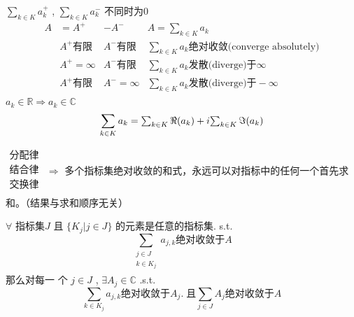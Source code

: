 \documentclass[mode=geye, chinesefont=founder]{elegantnote}
\newcommand\tikznode[3][]%
{\tikz[remember picture,baseline=(#2.base)]
	\node[minimum size=0pt,inner sep=0pt,#1](#2){#3};%
}
\begin{document}
$ \sum_{k\in K} a_k^+ $ ,
$ \sum_{k\in K} a_k^- $ 不同时为0
\begin{equation*}
    \begin{array}{llll}
        A &= A^+ &- A^- & A =  \sum_{k\in K} a_k \\ 
          &A^+\text{有限} & A^-\text{有限}& \sum_{k\in K} a_k \text{绝对收敛(converge absolutely)} \\
          &A^+=\infty & A^-\text{有限}& \sum_{k\in K} a_k \text{发散(diverge)于}\infty \\
          &A^+\text{有限} & A^-=\infty& \sum_{k\in K} a_k \text{发散(diverge)于}-\infty \\
    \end{array}
\end{equation*}
$ a_k\in\mathbb{R} \Rightarrow a_k\in\mathbb{C} $ 
\begin{equation*}
    \sum_{k\in K} a_k =
    \tikznode{akRe}{$ \sum_{k\in K} \Re{(a_k)} $ } +
    i\tikznode{akIm}{$ \sum_{k\in K} \Im{(a_k)} $ }    
\end{equation*}


$\begin{array}{l}
    \text{分配律}\\
    \text{结合律}\\
    \text{交换律}\\
\end{array}$
$ \Rightarrow $ 多个指标集绝对收敛的和式，永远可以对指标中的任何一个首先求和。（结果与求和顺序无关）

$ \forall $ 指标集$  J $  且 $ \{K_j|j\in J\} $  的元素是任意的指标集. s.t.
\begin{equation*}
    \sum_{
        \begin{array}{l}
            j\in J \\
            k\in K_j\\
        \end{array}}a_{j,k}
    \text{绝对收敛于}A
\end{equation*} 
那么对每一
个 $ j\in J $ , $ \exists A_j \in \mathbb{C} $ .s.t.
\begin{equation*}
    \sum_{k\in K_j}a_{j,k}
    \text{绝对收敛于}A_j. \;
    \text{且}\sum_{j\in J}A_j
    \text{绝对收敛于}A
\end{equation*}
\end{document}

